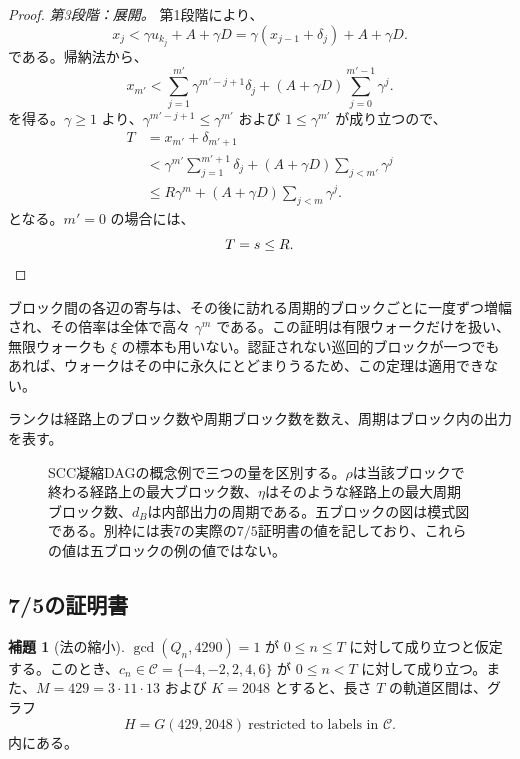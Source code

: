 \documentclass[11pt,reqno]{amsart}
\theoremstyle{definition}
\newtheorem{lemma}[theorem]{補題}
\theoremstyle{definition}
\theoremstyle{remark}
\begin{document}
\begin{proof}
\emph{第3段階：展開。} 第1段階により、
\[
x_j<\gamma u_{k_j}+A+\gamma D=\gamma(x_{j-1}+\delta_j)+A+\gamma D.
\]
である。帰納法から、
\[
x_{m'}<\sum_{j=1}^{m'}\gamma^{m'-j+1}\delta_j+(A+\gamma D)\sum_{j=0}^{m'-1}\gamma^j .
\]
を得る。\(\gamma\ge1\) より、\(\gamma^{m'-j+1}\le\gamma^{m'}\) および \(1\le\gamma^{m'}\) が成り立つので、
\[
\begin{aligned}
T&=x_{m'}+\delta_{m'+1}\\
&<\gamma^{m'}\sum_{j=1}^{m'+1}\delta_j+(A+\gamma D)\sum_{j<m'}\gamma^j\\
&\le R\gamma^{m}+(A+\gamma D)\sum_{j<m}\gamma^j .
\end{aligned}
\]
となる。\(m'=0\) の場合には、
\[
T=s\le R.\qedhere
\]
\end{proof}

ブロック間の各辺の寄与は、その後に訪れる周期的ブロックごとに一度ずつ増幅され、その倍率は全体で高々 \(\gamma^m\) である。この証明は有限ウォークだけを扱い、無限ウォークも \(\xi\) の標本も用いない。認証されない巡回的ブロックが一つでもあれば、ウォークはその中に永久にとどまりうるため、この定理は適用できない。

ランクは経路上のブロック数や周期ブロック数を数え、周期はブロック内の出力を表す。

\begin{figure}[htbp]
\centering

\caption{SCC凝縮DAGの概念例で三つの量を区別する。\(\rho\)は当該ブロックで終わる経路上の最大ブロック数、\(\eta\)はそのような経路上の最大周期ブロック数、\(d_B\)は内部出力の周期である。五ブロックの図は模式図である。別枠には表7の実際の\(7/5\)証明書の値を記しており、これらの値は五ブロックの例の値ではない。}
\label{fig:rank-certificate}
\end{figure}

\subsection{7/5の証明書}\label{sec:6.3}

\begin{samepage}
\begin{lemma}[法の縮小]\leavevmode\label{thm:28}
\(\gcd(Q_n,4290)=1\) が \(0\le n\le T\) に対して成り立つと仮定する。このとき、\(c_n\in\mathcal C=\{-4,-2,2,4,6\}\) が \(0\le n<T\) に対して成り立つ。また、\(M=429=3\cdot11\cdot13\) および \(K=2048\) とすると、長さ \(T\) の軌道区間は、グラフ
\[
H=G(429,2048)\ \text{restricted to labels in }\mathcal C .
\]
内にある。
\label{thm-end:28}
\end{lemma}
\end{samepage}
\end{document}
